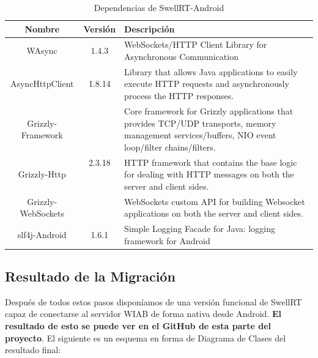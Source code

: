     \begin{table}[h]
      \footnotesize
      \begin{center}
	\begin{tabular}{ | c | c | m{8cm} | }
	  \hline
	  \textbf{Nombre} & \textbf{Versión} & \textbf{Descripción} \\
	  \hline
	  WAsync \cite{ref:wAsync_github} & 1.4.3 & WebSockets/HTTP Client Library for Asynchronous Communication \\ 
	  \hline
	  AsyncHttpClient \cite{ref:asyncHttpClient} & 1.8.14 & Library that allows Java applications to easily execute HTTP requests and asynchronously process the HTTP responses.\\ 
	  \hline
	  Grizzly-Framework \cite{ref:grizzly} & \multirow{3}{*}{2.3.18} & Core framework for Grizzly applications that provides TCP/UDP transports, memory management services/buffers, NIO event loop/filter chains/filters. \\ \cline{1-1} \cline{3-3} 
	  Grizzly-Http \cite{ref:grizzly} & & HTTP framework that contains the base logic for dealing with HTTP messages on both the server and client sides. \\ 
	  \cline{1-1} \cline{3-3} 
	  Grizzly-WebSockets \cite{ref:grizzly} & & WebSockets custom API for building Websocket applications on both the server and client sides. \\ 
	  \hline
	  slf4j-Android \cite{ref:slf4j_android} & 1.6.1 & Simple Logging Facade for Java: logging framework for Android \\ 
	  \hline
	\end{tabular}
      \end{center}
      \caption{Dependencias de SwellRT-Android}
      \label{fig:dependencies_swellRT}
    \end{table}       
       
    \subsection{Resultado de la Migración}
    
    Después de todos estos pasos disponíamos de una versión funcional de SwellRT capaz de conectarse al servidor WIAB de forma nativa desde Android. \textbf{El resultado de esto se puede ver en el GitHub de esta parte del proyecto}\cite{ref:wave_migration_github}. El siguiente es un esquema en forma de Diagrama de Clases del resultado final:
    
